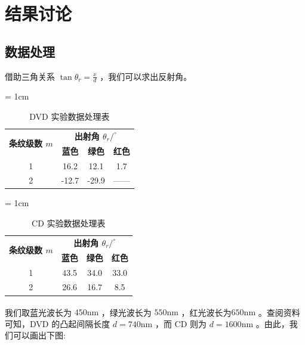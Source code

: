 \documentclass[fontset=windows]{article}
\newcommand{\upcite}[1]{\textsuperscript{\cite{#1}}}
\begin{document}
\newpage

\section{结果讨论}

\subsection{数据处理}

借助三角关系 $\tan \theta_r = \frac{x}{d}$ ，我们可以求出反射角。

\begin{table}[htbp]
    \centering
    \caption{DVD 实验数据处理表}
    \label{table3}
    \renewcommand\arraystretch{1.5}
    \tabcolsep = 1cm
    \begin{tabular}{|c|c|c|c|}
        \hline
        \multirow{2}{*}{\textbf{条纹级数 $m$}} & \multicolumn{3}{|c|}{\textbf{出射角 $\theta_r / ^\circ$}}\\
        \cline{2-4} %
        & \textbf{蓝色} & \textbf{绿色} & \textbf{红色} \\
        \hline
        1 & 16.2 & 12.1 & 1.7 \\
        \hline
        2 & -12.7 & -29.9 & —— \\
        \hline
    \end{tabular}
\end{table}

\begin{table}[htbp]
    \centering
    \caption{CD 实验数据处理表}
    \label{table4}
    \renewcommand\arraystretch{1.5}
    \tabcolsep = 1cm
    \begin{tabular}{|c|c|c|c|}
        \hline
        \multirow{2}{*}{\textbf{条纹级数 $m$}} & \multicolumn{3}{|c|}{\textbf{出射角 $\theta_r / ^\circ$}}\\
        \cline{2-4} %
        & \textbf{蓝色} & \textbf{绿色} & \textbf{红色} \\
        \hline
        1 & 43.5 & 34.0 & 33.0 \\
        \hline
        2 & 26.6 & 16.7 &  8.5 \\
        \hline
    \end{tabular}
\end{table}

我们取蓝光波长为 $450\mathrm{nm}$ ，绿光波长为 $550\mathrm{nm}$ ，红光波长为$650\mathrm{nm}$ 。查阅资料\upcite{ref1}可知，DVD 的凸起间隔长度 $d = 740\mathrm{nm}$ ，而 CD 则为 $d = 1600\mathrm{nm}$ 。由此，我们可以画出下图:
\end{document}
